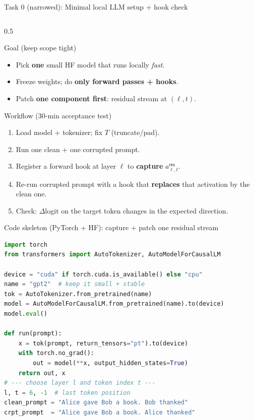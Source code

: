 \documentclass[aspectratio=169,xcolor={dvipsnames}]{beamer}
\renewcommand{\accent}[1]{\textbf{#1}}
\begin{document}
\begin{frame}[fragile,shrink=50]{Task 0 (narrowed): Minimal local LLM setup + hook check}
\small
\begin{columns}[T,onlytextwidth]
\begin{column}{0.5\textwidth}
\begin{block}{Goal (keep scope tight)}
\begin{itemize}\setlength\itemsep{3pt}
\item Pick \accent{one} small HF model that runs locally \emph{fast}.
\item Freeze weights; do \accent{only forward passes + hooks}.
\item Patch \accent{one component first}: residual stream at $(\ell,t)$.
\end{itemize}
\end{block}

\begin{block}{Workflow (30-min acceptance test)}
\begin{enumerate}\setlength\itemsep{2pt}
\item Load model + tokenizer; fix $T$ (truncate/pad).
\item Run one clean + one corrupted prompt.
\item Register a forward hook at layer $\ell$ to \accent{capture} $a_{\ell,t}^{\textsf{res}}$.
\item Re-run corrupted prompt with a hook that \accent{replaces} that activation by the clean one.
\item Check: $\Delta$logit on the target token changes in the expected direction.
\end{enumerate}
\end{block}

\begin{block}{Code skeleton (PyTorch + HF): capture + patch one residual stream}
\begin{lstlisting}[language=Python,basicstyle=\ttfamily\scriptsize]
import torch
from transformers import AutoTokenizer, AutoModelForCausalLM

device = "cuda" if torch.cuda.is_available() else "cpu"
name = "gpt2"  # keep it small + stable
tok = AutoTokenizer.from_pretrained(name)
model = AutoModelForCausalLM.from_pretrained(name).to(device)
model.eval()

def run(prompt):
    x = tok(prompt, return_tensors="pt").to(device)
    with torch.no_grad():
        out = model(**x, output_hidden_states=True)
    return out, x
# --- choose layer l and token index t ---
l, t = 6, -1  # last token position
clean_prompt = "Alice gave Bob a book. Bob thanked"
crpt_prompt  = "Alice gave Bob a book. Alice thanked"
\end{lstlisting}
\end{block}



\end{column}
\end{columns}
\end{frame}
\end{document}
